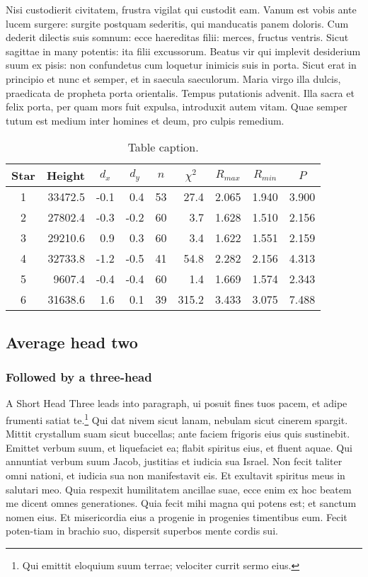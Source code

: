 \documentclass{jdsart}
\theoremstyle{plain}
\theoremstyle{remark}
\theoremstyle{definition}
\begin{document}
Nisi custodierit civitatem, frustra vigilat qui custodit eam. Vanum
est vobis ante lucem surgere: surgite postquam sederitis, qui
manducatis panem doloris. Cum dederit dilectis suis somnum: ecce
haereditas filii: merces, fructus ventris. Sicut sagittae in many
potentis: ita filii excussorum. Beatus vir qui implevit desiderium
suum ex pisis: non confundetus cum loquetur inimicis suis in porta.
Sicut erat in principio et nunc et semper, et in saecula saeculorum.
Maria virgo illa dulcis, praedicata de propheta porta orientalis.
Tempus putationis advenit.  Illa sacra et felix porta, per quam mors
fuit expulsa, introduxit autem vitam.  Quae semper tutum est medium
inter homines et deum, pro culpis remedium.


\begin{table}
\caption{Table caption.}\label{tbl-2}
\begin{tabular*}{\textwidth}{@{\extracolsep{\fill}}crrrrrrrr@{}}
\hline
Star & Height & \multicolumn{1}{c}{$d_{x}$} &
\multicolumn{1}{c}{$d_{y}$} &
\multicolumn{1}{c}{$n$} &
\multicolumn{1}{c}{$\chi^2$} &
\multicolumn{1}{c}{$R_{max}$} &
\multicolumn{1}{c}{$R_{min}$} &
\multicolumn{1}{c}{$P$}  \\
\hline
1 &33472.5 &-0.1 &0.4  &53 &27.4  &2.065  &1.940 &3.900\\
2 &27802.4 &-0.3 &-0.2 &60 &3.7   &1.628  &1.510 &2.156\\
3 &29210.6 &0.9  &0.3  &60 &3.4   &1.622  &1.551 &2.159\\
4 &32733.8 &-1.2 &-0.5 &41 &54.8  &2.282  &2.156 &4.313\\
5 & 9607.4 &-0.4 &-0.4 &60 &1.4   &1.669  &1.574 &2.343\\
6 &31638.6 &1.6  &0.1  &39 &315.2 & 3.433 &3.075 &7.488\\
\hline
\end{tabular*}
\end{table}


\subsection{Average head two}

\subsubsection{Followed by a three-head}

A Short Head Three leads into paragraph, ui posuit fines tuos pacem,
et adipe frumenti satiat te.\footnote{Qui emittit eloquium suum terrae;
velociter currit sermo eius.} Qui dat nivem sicut lanam, nebulam
sicut cinerem spargit. Mittit crystallum suam sicut buccellas; ante
faciem frigoris eius quis sustinebit. Emittet verbum suum, et
liquefaciet ea; flabit spiritus eius, et fluent aquae. Qui annuntiat
verbum suum Jacob, justitias et iudicia sua Israel. Non fecit taliter omni
nationi, et iudicia sua non manifestavit eis. Et exultavit spiritus meus
in salutari meo.  Quia respexit humilitatem ancillae suae, ecce enim ex
hoc beatem me dicent omnes generationes. Quia fecit mihi magna qui potens
est; et sanctum nomen eius. Et misericordia eius a progenie in progenies
timentibus eum. Fecit poten-tiam in brachio suo, dispersit superbos mente
cordis sui.
\end{document}
